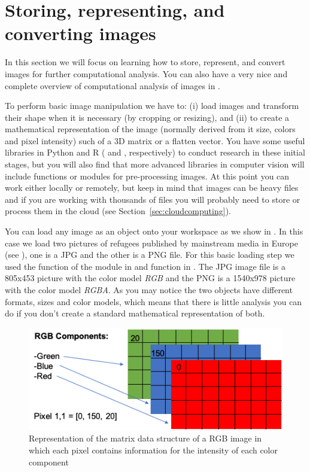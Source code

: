 \section{Storing, representing, and converting images}
\label{sec:storing}

In this section we will focus on learning how to store, represent, and convert images for further computational analysis. You can also have a very nice and complete overview of computational analysis of images in \citet{williams2020images}.

To perform basic image manipulation we have to: (i) load images and transform their shape when it is necessary (by cropping or resizing), and (ii) to create a mathematical representation of the image (normally derived from it size, colors and pixel intensity) such of a 3D matrix or a flatten vector. You have some useful libraries in Python and R ( and , respectively) to conduct research in these initial stages, but you will also find that more advanced libraries in computer vision will include functions or modules for pre-processing images. At this point you can work either locally or remotely, but keep in mind that images can be heavy files and if you are working with thousands of files you will probably need to store or process them in the cloud (see Section~\ref{sec:cloudcomputing}).

You can load any image as an object onto your workspace as we show in . In this case we load two pictures of refugees published by mainstream media in Europe (see \citet{amores2019visual}), one is a JPG and the other is a PNG file. For this basic loading step we used the  function of the  module in  and  function in . The JPG image file is a 805x453 picture with the color model \textit{RGB} and the PNG is a 1540x978 picture with the color model \textit{RGBA}. As you may notice the two objects have different formats, sizes and color models, which means that there is little analysis you can do if you don't create a standard mathematical representation of both. 


\begin{figure}
\centering
\includegraphics[width=0.9\linewidth]{figures/ch15_pixel.png}
\caption{Representation of the matrix data structure of a RGB image in which each pixel contains information for the intensity of each color component}
\label{fig:pixel}
\end{figure}

